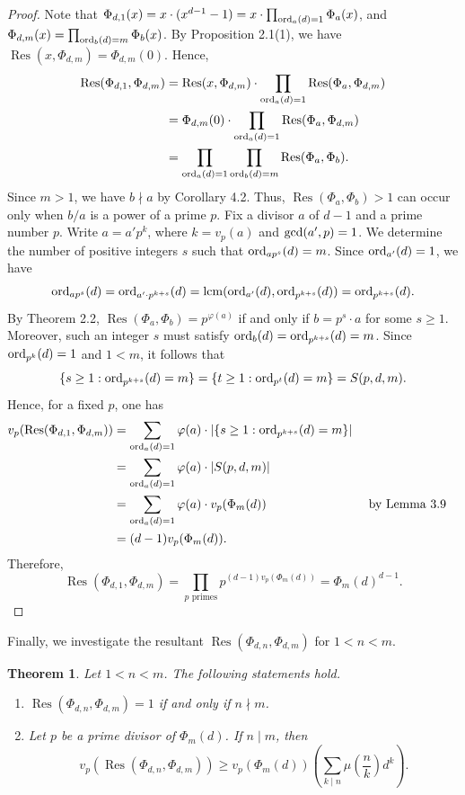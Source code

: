 \documentclass[10pt,leqno]{amsart}
\newtheorem{theorem}{Theorem}[section]
\theoremstyle{definition}
\theoremstyle{remark}
\numberwithin{equation}{section}
\def\gcd{{\rm gcd}}
\def\lcm{{\rm lcm}}
\def\ord{{\rm ord}}
\newcommand{\res}{\operatorname{Res}}
\begin{document}
\begin{proof}
    Note that $\Phi_{d,1}(x)= x\cdot(x^{d-1}-1) = x\cdot\prod_{\ord_a(d) = 1}\Phi_a(x)$, and $\Phi_{d,m}(x) = \prod_{\ord_b(d) = m}\Phi_b(x)$. By Proposition 2.1(1), we have $\res(x,\Phi_{d,m}) = \Phi_{d,m}(0)$. Hence,
    \begin{align*}
        \res(\Phi_{d,1},\Phi_{d,m}) &= \res(x,\Phi_{d,m})\cdot\prod_{\ord_a(d) = 1}\res(\Phi_a,\Phi_{d,m})\\
        &= \Phi_{d,m}(0)\cdot\prod_{\ord_a(d) = 1}\res(\Phi_a,\Phi_{d,m})\\
        &= \prod_{\ord_a(d) = 1}\prod_{\ord_b(d) = m}\res(\Phi_a,\Phi_b).
    \end{align*}
    Since $m>1$, we have $b\nmid a$ by Corollary 4.2. Thus, $\res(\Phi_a,\Phi_b)>1$ can occur only when $b/a$ is a power of a prime $p$. Fix a divisor $a$ of $d-1$ and a prime number $p$. Write $a = a'p^k$, where $k = v_p(a)$ and $\gcd(a',p) = 1$. We determine the number of positive integers $s$ such that $\ord_{ap^s}(d) = m$. Since $\ord_{a'}(d) = 1$, we have
    $$\ord_{ap^s}(d) = \ord_{a'\cdot p^{k+s}}(d) = \lcm(\ord_{a'}(d),\ord_{p^{k+s}}(d)) = \ord_{p^{k+s}}(d).$$
    By Theorem 2.2, $\res(\Phi_a,\Phi_b) = p^{\varphi(a)}$ if and only if $b = p^s\cdot a$ for some $s\geq 1$. Moreover, such an integer $s$ must satisfy $\ord_b(d) = \ord_{p^{k+s}}(d) = m$. Since $\ord_{p^k}(d) = 1$ and $1<m$, it follows that 
    $$\{s\geq 1:\ord_{p^{k+s}}(d) = m\} = \{t\geq 1:\ord_{p^t}(d) = m\} =  S(p,d,m).$$
    Hence, for a fixed $p$, one has
    \begin{align*}
        v_p(\res(\Phi_{d,1},\Phi_{d,m})) &= \sum_{\ord_a(d) = 1}\varphi(a)\cdot|\{s\geq 1:\ord_{p^{k+s}}(d) = m\}|\\
        &= \sum_{\ord_a(d) = 1}\varphi(a)\cdot|S(p,d,m)|\\
        &= \sum_{\ord_a(d) = 1}\varphi(a)\cdot v_p(\Phi_m(d))&&\text{ by Lemma 3.9}\\
        &= (d-1)v_p(\Phi_m(d)).
    \end{align*}
    Therefore,
    $$\res(\Phi_{d,1},\Phi_{d,m}) = \prod_{p\text{ primes}}p^{(d-1)v_p(\Phi_m(d))} = \Phi_m(d)^{d-1}.$$
\end{proof}

Finally, we investigate the resultant $\res(\Phi_{d,n},\Phi_{d,m})$ for $1<n<m$. 

\begin{theorem}
    Let $1<n<m$. The following statements hold. 
    \begin{enumerate}
        \item $\res(\Phi_{d,n},\Phi_{d,m}) = 1$ if and only if $n\nmid m$.
        \item Let $p$ be a prime divisor of $\Phi_{m}(d)$. If $n\mid m$, then
        $$v_p(\res(\Phi_{d,n},\Phi_{d,m}))\geq v_p(\Phi_m(d))\left(\sum_{k\mid n}\mu\left(\frac{n}{k}\right)d^k\right).$$
    \end{enumerate}
\end{theorem}
\end{document}
